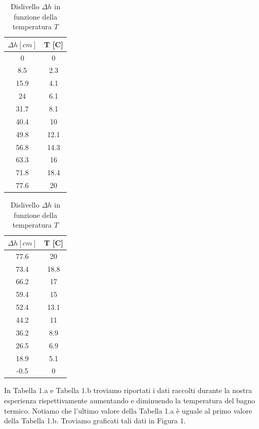 \begin{table}[H]
\centering

	\begin{subtable}{.5\textwidth}
		\centering
		\begin{tabular}{|c|c|} \hline
			\textbf{$\Delta h {[cm]}$ } & \textbf{T {[\degree C]} }  \\ \hline
			0 & 0  \\ \hline
			8.5 & 2.3  \\ \hline
			15.9 & 4.1  \\ \hline
			24 & 6.1  \\ \hline
			31.7 & 8.1  \\ \hline
			40.4 & 10  \\ \hline
			49.8 & 12.1  \\ \hline
			56.8 & 14.3  \\ \hline
			63.3 & 16  \\ \hline
			71.8 & 18.4  \\ \hline
			77.6 & 20  \\ \hline
		\end{tabular}
		\caption{Aumento della temperatura}
	\end{subtable}%
	\begin{subtable}{.5\textwidth}
	\centering
	\begin{tabular}{|c|c|} \hline
		\textbf{$\Delta h {[cm]}$ } & \textbf{T {[\degree C]} }  \\ \hline
		77.6 & 20  \\ \hline
		73.4 & 18.8  \\ \hline
		66.2 & 17  \\ \hline
		59.4 & 15  \\ \hline
		52.4 & 13.1  \\ \hline
		44.2 & 11  \\ \hline
		36.2 & 8.9  \\ \hline
		26.5 & 6.9  \\ \hline
		18.9 & 5.1  \\ \hline
		-0.5 & 0  \\ \hline
	\end{tabular}
	\caption{Diminuzione della temperatura}
\end{subtable}

\caption{Dislivello $\Delta h$ in funzione della temperatura $T$}
\end{table}
In Tabella 1.a e Tabella 1.b troviamo riportati i dati raccolti durante la nostra esperienza rispettivamente aumentando e diminuendo la temperatura del bagno termico. 
Notiamo che l'ultimo valore della Tabella 1.a è uguale al primo valore della Tabella 1.b.
Troviamo graficati tali dati in Figura 1. 

